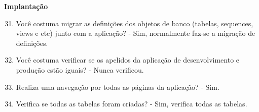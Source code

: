 \begin{apendicesenv}
\textbf{Implantação}

\begin{enumerate}
	\setcounter{enumi}{30}
	\item Você costuma migrar as definições dos objetos de banco (tabelas, sequences, views e
	etc) junto com a aplicação?\newline
	- Sim, normalmente faz-se a migração de definições.
	\item Você costuma verificar se os apelidos da aplicação de desenvolvimento e produção
	estão iguais?\newline
	- Nunca verificou.
	\item Realiza uma navegação por todas as páginas da aplicação?\newline
	- Sim.
	\item Verifica se todas as tabelas foram criadas?\newline
	- Sim, verifica todas as tabelas.
\end{enumerate}


\end{apendicesenv}
